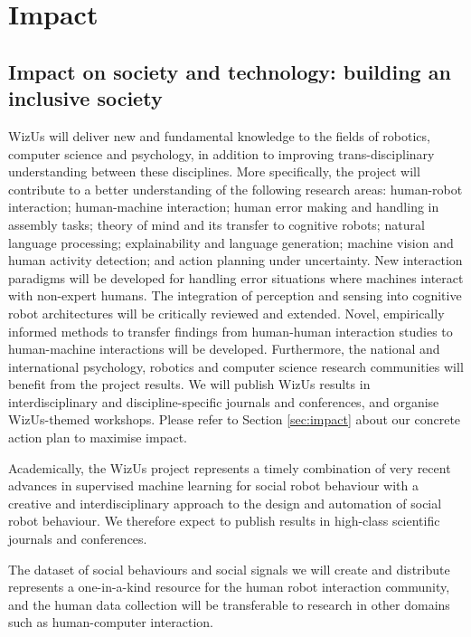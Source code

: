 \documentclass[11pt,a4paper]{report}
\newcommand{\project}{WizUs\xspace}
\begin{document}
\section{Impact}\label{impact}

\subsection{Impact on society and technology: building an inclusive society}


\project will deliver new and fundamental knowledge to the fields of robotics,
computer science and psychology, in addition to improving trans-disciplinary
understanding between these disciplines. More specifically, the project will
contribute to a better understanding of the following research areas:
human-robot interaction; human-machine interaction; human error making and
handling in assembly tasks; theory of mind and its transfer to cognitive robots;
natural language processing; explainability and language generation; machine
vision and human activity detection; and action planning under uncertainty. New
interaction paradigms will be developed for handling error situations where
machines interact with non-expert humans. The integration of perception and
sensing into cognitive robot architectures will be critically reviewed and
extended. Novel, empirically informed methods to transfer findings from
human-human interaction studies to human-machine interactions will be developed.
Furthermore, the national and international psychology, robotics and computer
science research communities will benefit from the project results. We will
publish \project results in interdisciplinary and discipline-specific journals
and conferences, and organise \project-themed workshops. Please refer to Section
\ref{sec:impact} about our concrete action plan to maximise impact. 




Academically, the \project project represents a timely combination of
very recent advances in supervised machine learning for social robot
behaviour with a creative and interdisciplinary approach to the design
and automation of social robot behaviour. We therefore expect to publish
results in high-class scientific journals and conferences.

The dataset of social behaviours and social signals we will create and
distribute represents a one-in-a-kind resource for the human robot
interaction community, and the human data collection will be
transferable to research in other domains such as human-computer
interaction.
\end{document}
